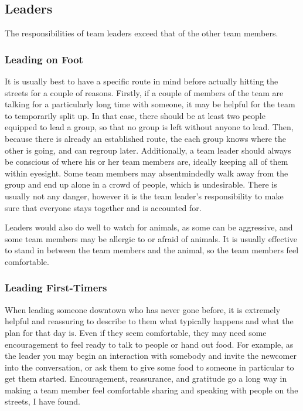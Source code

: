\documentclass[12pt]{article}
\begin{document}
\subsection{Leaders}

The responsibilities of team leaders exceed that of the other team members.

\subsubsection{Leading on Foot}

    \qLeaders
    It is usually best to have a specific route in mind before actually hitting the streets for a couple of reasons.
    Firstly, if a couple of members of the team are talking for a particularly long time with someone, it may be helpful for the team to temporarily split up.
    In that case, there should be at least two people equipped to lead a group, so that no group is left without anyone to lead.
    Then, because there is already an established route, the each group knows where the other is going, and can regroup later.
    Additionally, a team leader should always be conscious of where his or her team members are, ideally keeping all of them within eyesight.
    Some team members may absentmindedly walk away from the group and end up alone in a crowd of people, which is undesirable.
    There is usually not any danger, however it is the team leader's responsibility to make sure that everyone stays together and is accounted for.
    \par Leaders would also do well to watch for animals, as some can be aggressive, and some team members may be allergic to or afraid of animals.
    It is usually effective to stand in between the team members and the animal, so the team members feel comfortable.

\subsubsection{Leading First-Timers}

    When leading someone downtown who has never gone before, it is extremely helpful and reassuring to describe to them what typically happens and what the plan for that day is.
    Even if they seem comfortable, they may need some encouragement to feel ready to talk to people or hand out food.
    For example, as the leader you may begin an interaction with somebody and invite the newcomer into the conversation, or ask them to give some food to someone in particular to get them started.
    Encouragement, reassurance, and gratitude go a long way in making a team member feel comfortable sharing and speaking with people on the streets, I have found.
\end{document}
